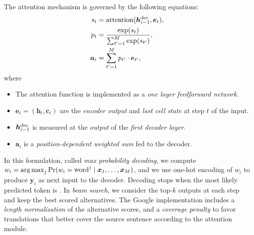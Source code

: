 The attention mechanism is governed by the following equations:
\begin{align*}
	s_t &= \mathrm{attention}(\bm{h}_{i-1}^\textnormal{dec}, \bm{e}_t),\\
	p_t &= \frac{\exp(s_t)}{\sum_{t' = 1}^M \exp(s_{t'})},\\
	\bm{a}_i &= \sum_{t'=1}^M p_{t'} \cdot \bm{e}_{t'},
\end{align*}
where
\begin{itemize}
	\item The attention function is implemented as a \emph{one layer feedforward network}.
	\item \(\bm{e}_t = (\bm{h}_t, \bm{c}_t)\) are the \emph{encoder output} and \emph{last cell state} at step \(t\) of the input.
	\item \(\bm{h}_{i-1}^\textnormal{dec}\) is measured at the \emph{output} of the \emph{first decoder layer}.
	\item \(\bm{a}_i\) is a \emph{position-dependent weighted sum} fed to the decoder.
\end{itemize}

In this formulation, called \emph{max probability decoding}, we compute \(w_i = \operatorname*{arg\,max}_j \Pr(w_i = \textnormal{word}^j \mid \bm{x}_1, \dots, \bm{x}_M)\), and we use one-hot encoding of \(w_i\) to produce \(\bm{y}_i\) as next input to the decoder.
Decoding stops when the most likely predicted token is \etoken.
In \emph{beam search}, we consider the top-\(k\) outputs at each step and keep the best scored alternatives.
The Google implementation includes a \emph{length normalization} of the alternative scores, and a \emph{coverage penalty} to favor translations that better cover the source sentence according to the attention module.